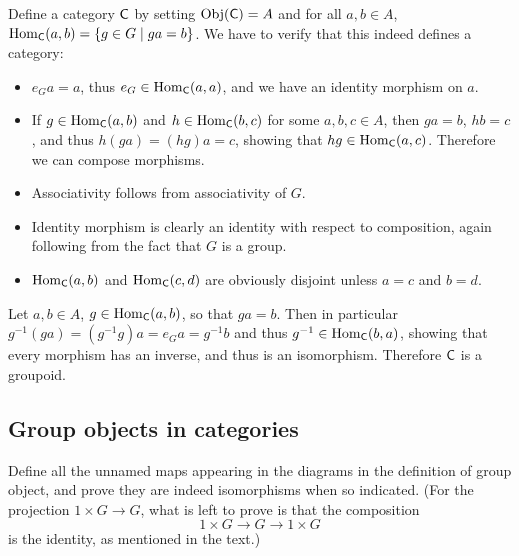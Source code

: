 \begin{solution}
	Define a category $\mathsf{C}$ by setting $\mathrm{Obj}(\mathsf{C}) = A$ and for all $a, b \in A$, $\mathrm{Hom}_{\mathsf{C}}(a, b) = \{ g \in G \mid ga = b \}$. We have to verify that this indeed defines a category:
	\begin{itemize}
		\item $e_G a = a$, thus $e_G \in \mathrm{Hom}_{\mathsf{C}}(a, a)$, and we have an identity morphism on $a$.
		\item If $g \in \mathrm{Hom}_{\mathsf{C}}(a, b)$ and $h \in \mathrm{Hom}_{\mathsf{C}}(b, c)$ for some $a, b, c \in A$, then $ga = b$, $hb = c$, and thus $h(ga) = (hg)a = c$, showing that $hg \in \mathrm{Hom}_{\mathsf{C}}(a, c)$. Therefore we can compose morphisms.
		\item Associativity follows from associativity of $G$.
		\item Identity morphism is clearly an identity with respect to composition, again following from the fact that $G$ is a group.
		\item $\mathrm{Hom}_{\mathsf{C}}(a, b)$ and $\mathrm{Hom}_{\mathsf{C}}(c, d)$ are obviously disjoint unless $a = c$ and $b = d$.
	\end{itemize}

	Let $a, b \in A$, $g \in \mathrm{Hom}_{\mathsf{C}}(a, b)$, so that $ga = b$. Then in particular $g^{-1}(ga) = (g^{-1}g)a = e_G a = g^{-1} b$ and thus $g^{-1} \in \mathrm{Hom}_{\mathsf{C}}(b, a)$, showing that every morphism has an inverse, and thus is an isomorphism. Therefore $\mathsf{C}$ is a groupoid.
\end{solution}

\subsection{Group objects in categories}

\begin{problem}
	Define all the unnamed maps appearing in the diagrams in the definition of group object, and prove they are indeed isomorphisms when so indicated. (For the projection $1 \times G \to G$, what is left to prove is that the composition
	\[
		1 \times G \to G \to 1 \times G
	\]
	is the identity, as mentioned in the text.)
\end{problem}

